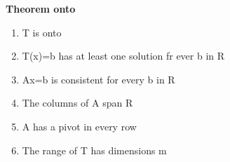 \textbf{Theorem onto}
\begin{enumerate}
	\item T is onto
	\item T(x)=b has at least one solution fr ever b in R
	\item Ax=b is consistent for every b in R
	\item The columns of A span R
	\item A has a pivot in every row 
	\item The range of T has dimensions m
\end{enumerate}









